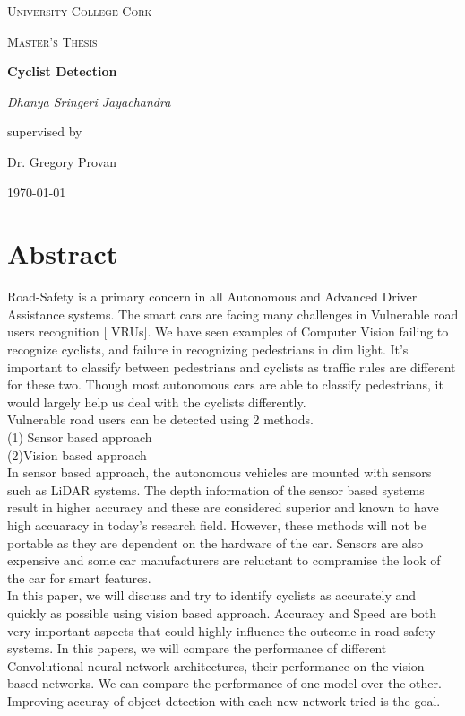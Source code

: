 \documentclass[11pt]{article}\usepackage[]{graphicx}\usepackage[]{color}
\begin{document}
\begin{titlepage}
\centering
{\scshape\LARGE University College Cork\par}
\vspace{1cm}
{\scshape\Large Master's Thesis \par}
\vspace{1.5cm}
{\huge\bfseries Cyclist Detection\par}  
\vspace{0.5cm}
{\Large\itshape Dhanya Sringeri Jayachandra \par}
\vfill
supervised by\par
Dr. Gregory Provan
\vfill
{\large \today\par}
\end{titlepage}

\setcounter{tocdepth}{2}
\tableofcontents
\clearpage
\listoftables
\listoffigures
\clearpage

\section{Abstract}
Road-Safety is a primary concern in all Autonomous and Advanced Driver Assistance systems. The smart cars are facing many challenges in Vulnerable road users recognition [ VRUs]. We have seen examples of Computer Vision failing to recognize cyclists, and failure in recognizing pedestrians in dim light. It’s important to classify between pedestrians and cyclists as traffic rules are different for these two. Though most autonomous cars are able to classify pedestrians, it would largely help us deal with the cyclists differently.\\

Vulnerable road users can be detected using 2 methods.\\
(1) Sensor based approach\\
(2)Vision based approach\\

In sensor based approach, the autonomous vehicles are mounted with sensors such as LiDAR systems. The depth information of the sensor based systems result in higher accuracy and 
these are considered superior and known to have high accuaracy in today's research field. However, these methods will not be portable as they are dependent on the hardware of the car. Sensors are also expensive and some car manufacturers are reluctant to compramise the look of the car for smart features.\\

In this paper, we will discuss and try to identify cyclists as accurately and quickly as possible using vision based approach. Accuracy and Speed are both very important aspects that could highly influence the outcome in road-safety systems. In this papers, we will compare the performance of different Convolutional neural network architectures, their performance on the vision-based networks. We can compare the performance of one model over the other. Improving accuray of object detection with each new network tried is the goal.\\
\end{document}
